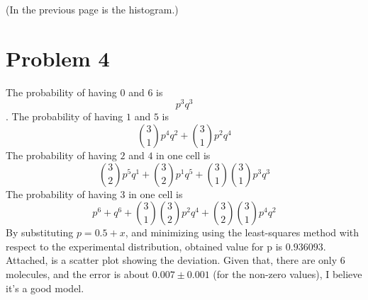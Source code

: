 \documentclass{article}
\begin{document}


\setlength{\voffset}{-2.54cm}
\setlength{\hoffset}{-2.54cm}
\setlength{\voffset}{0cm}
\setlength{\hoffset}{0cm}



\setlength{\voffset}{-2.54cm}
\setlength{\hoffset}{-2.54cm}





\setlength{\voffset}{0cm}
\setlength{\hoffset}{0cm}



\setlength{\voffset}{-2.54cm}
\setlength{\hoffset}{-2.54cm}

(In the previous page is the histogram.)

\section{Problem 4}
The probability of having $0$ and $6$ is $$p^{3}q^{3}$$. 
The probability of having $1$ and $5$ is 
$$\binom{3}{1}p^{4}q^{2}+\binom{3}{1}p^{2}q^{4}$$
The probability of having $2$ and $4$ in one cell is
$$\binom{3}{2}p^{5}q^{1}+\binom{3}{2}p^{1}q^{5}+\binom{3}{1}\binom{3}{1}p^{3}q^{3}$$
The probability of having $3$ in one cell is
$$p^{6}+q^{6}+\binom{3}{1}\binom{3}{2}p^{2}q^{4}+\binom{3}{2}\binom{3}{1}p^{4}q^{2}$$
By substituting $p=0.5+x$, and minimizing using the least-squares method with respect to the experimental distribution, obtained value for p is $0.936093$.
Attached, is a scatter plot showing the deviation. Given that, there are only 6 molecules, and the error is about $0.007 \pm 0.001$ (for the non-zero values), I believe it's a good model.

\setlength{\voffset}{0cm}
\setlength{\hoffset}{0cm}



\setlength{\voffset}{-2.54cm}
\setlength{\hoffset}{-2.54cm}
\end{document}
